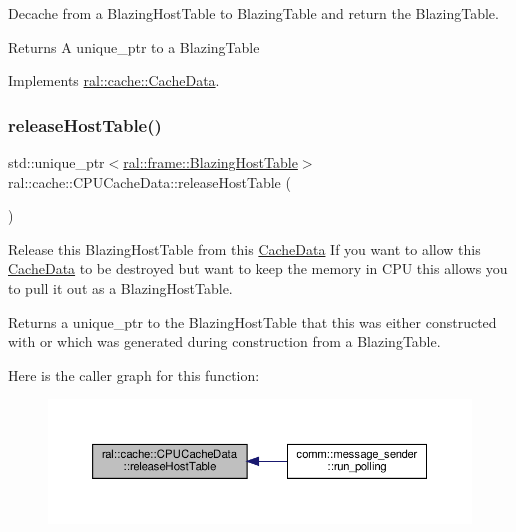 Decache from a Blazing\+Host\+Table to Blazing\+Table and return the Blazing\+Table. \begin{DoxyReturn}{Returns}
A unique\+\_\+ptr to a Blazing\+Table 
\end{DoxyReturn}


Implements \hyperlink{classral_1_1cache_1_1CacheData_a2db8fdd2151babd7a07f4c6e246b710c}{ral\+::cache\+::\+Cache\+Data}.

\mbox{\label{classral_1_1cache_1_1CPUCacheData_a817e6a8d23b4839f4e77c102a4ac0aad}} 
\subsubsection{\texorpdfstring{release\+Host\+Table()}{releaseHostTable()}}
{\footnotesize\ttfamily std\+::unique\+\_\+ptr$<$\hyperlink{classral_1_1frame_1_1BlazingHostTable}{ral\+::frame\+::\+Blazing\+Host\+Table}$>$ ral\+::cache\+::\+C\+P\+U\+Cache\+Data\+::release\+Host\+Table (\begin{DoxyParamCaption}{ }\end{DoxyParamCaption})\hspace{0.3cm}{\ttfamily [inline]}}

Release this Blazing\+Host\+Table from this \hyperlink{classral_1_1cache_1_1CacheData}{Cache\+Data} If you want to allow this \hyperlink{classral_1_1cache_1_1CacheData}{Cache\+Data} to be destroyed but want to keep the memory in C\+PU this allows you to pull it out as a Blazing\+Host\+Table. \begin{DoxyReturn}{Returns}
a unique\+\_\+ptr to the Blazing\+Host\+Table that this was either constructed with or which was generated during construction from a Blazing\+Table. 
\end{DoxyReturn}
Here is the caller graph for this function\+:\nopagebreak
\begin{figure}[H]
\begin{center}
\leavevmode
\includegraphics[width=350pt]{classral_1_1cache_1_1CPUCacheData_a817e6a8d23b4839f4e77c102a4ac0aad_icgraph}
\end{center}
\end{figure}
\mbox{\label{classral_1_1cache_1_1CPUCacheData_a3d0444ff9ba0814775499060071a2d1a}} 
